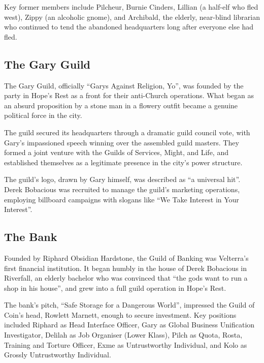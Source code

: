 Key former members include Pilcheur, Burnie Cinders, Lillian (a half-elf who fled west), Zippy (an alcoholic gnome), and Archibald, the elderly, near-blind librarian who continued to tend the abandoned headquarters long after everyone else had fled.

\smallskip

\subsection*{The Gary Guild}

The Gary Guild, officially ``Garys Against Religion, Yo'', was founded by the party in Hope's Rest as a front for their anti-Church operations.  What began as an absurd proposition by a stone man in a flowery outfit became a genuine political force in the city.

The guild secured its headquarters through a dramatic guild council vote, with Gary's impassioned speech winning over the assembled guild masters.  They formed a joint venture with the Guilds of Services, Might, and Life, and established themselves as a legitimate presence in the city's power structure.

The guild's logo, drawn by Gary himself, was described as ``a universal hit''.  Derek Bobacious was recruited to manage the guild's marketing operations, employing billboard campaigns with slogans like ``We Take Interest in Your Interest''.

\smallskip

\subsection*{The Bank}

Founded by Riphard Obsidian Hardstone, the Guild of Banking was Velterra's first financial institution.  It began humbly in the house of Derek Bobacious in Riverfall, an elderly bachelor who was convinced that ``the gods want to run a shop in his house'', and grew into a full guild operation in Hope's Rest.

The bank's pitch, ``Safe Storage for a Dangerous World'', impressed the Guild of Coin's head, Rowlett Marnett, enough to secure investment.  Key positions included Riphard as Head Interface Officer, Gary as Global Business Unification Investigator, Delilah as Job Organiser (Lower Klass), Pilch as Quota, Rosta, Training and Torture Officer, Exme as Untrustworthy Individual, and Kolo as Grossly Untrustworthy Individual.

\smallskip

